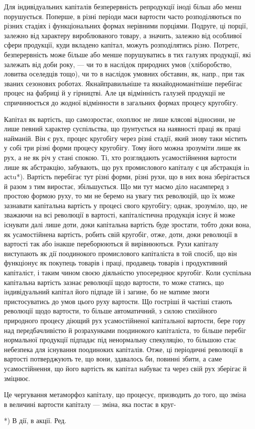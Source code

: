 Для індивідуальних капіталів безперервність репродукції іноді більш
або менш порушується. Поперше, в різні періоди маси вартости часто
розподіляються по різних стадіях і функціональних формах нерівними
порціями. Подруге, ці порції, залежно від характеру вироблюваного товару,
а значить, залежно від особливої сфери продукції, куди вкладено капітал,
можуть розподілятись різно. Потретє, безперервність може більше або
менше порушуватись в тих галузях продукції, які залежать від доби
року, — чи то в наслідок природних умов (хліборобство, ловитва оселедців
тощо), чи то в наслідок умовних обставин, як, напр., при так званих сезонових
роботах. Якнайправильніше та якнайодноманітніше перебігає процес
на фабриці й у гірництві. Але ця відмінність галузей продукції не спричинюється
до жодної відмінности в загальних формах процесу кругобігу.

Капітал як вартість, що самозростає, охоплює не лише клясові
відносини, не лише певний характер суспільства, що ґрунтується на наявності
праці як праці найманій. Він є рух, процес кругобігу через різні
стадії, який знову таки містить у собі три різні форми процесу кругобігу.
Тому його можна зрозуміти лише як рух, а не як річ у стані спокою.
Ті, хто розглядають усамостійнення вартости лише як абстракцію, забувають,
що рух промислового капіталу є ця абстракція іn асtu*). Вартість
перебігає тут різні форми, різні рухи, що в них вона зберігається й разом
з тим виростає, збільшується. Що ми тут маємо діло насамперед з простою
формою руху, то ми не беремо на увагу тих революцій, що їх
може зазнавати капітальна вартість у процесі свого кругобігу; однак,
зрозуміло, що, не зважаючи на всі революції в вартості, капіталістична
продукція існує й може існувати далі лише доти, доки капітальна вартість
буде зростати, тобто доки вона, як усамостійнена вартість, робить
свій кругобіг, отже, доти, доки революції в вартості так або інакше
переборюються й вирівнюються. Рухи капіталу виступають як дії поодинокого
промислового капіталіста в той спосіб, що він функціонує як
покупець товарів і праці, продавець товарів і продуктивний капіталіст,
і таким чином своєю діяльністю упосереднює кругобіг. Коли суспільна
капітальна вартість зазнає революції щодо вартости, то може статись, що
індивідуальний капітал його підпаде їй і загине, бо не матиме змоги пристосуватись
до умов цього руху вартости. Що гостріші й частіші стають
революції щодо вартости, то більше автоматичний, з силою стихійного
природного процесу діющий рух усамостійненої капітальної вартости,
бере гору над передбачливістю й розрахунками поодинокого капіталіста,
то більше перебіг нормальної продукції підпадає під ненормальну спекуляцію,
то більшою стає небезпека для існування поодиноких капіталів.
Отже, ці періодичні революції в вартості потверджують те, що вони,
здавалось би, повинні збити, а саме усамостійнення, що його вартість
як капітал набуває та через свій рух зберігає й зміцнює.

Це чергування метаморфоз капіталу, що процесує, призводить до
того, що зміна в величині вартости капіталу — зміна, яка постає в круг-

*) В дії, в акції. Ред.
